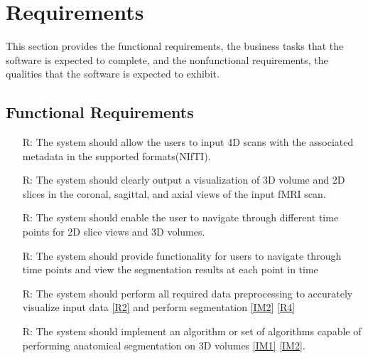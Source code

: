 \documentclass[12pt]{article}
\newcounter{reqnum} %
\begin{document}
\section{Requirements}

This section provides the functional requirements, the business tasks that the
software is expected to complete, and the nonfunctional requirements, the
qualities that the software is expected to exhibit.

\subsection{Functional Requirements}

\noindent \begin{itemize}

  \item[R\refstepcounter{reqnum}\thereqnum \label{R1}:] The system should allow the users
        to input 4D scans with the associated metadata in the supported formats(NIfTI).

  \item[R\refstepcounter{reqnum}\thereqnum \label{R2}:] The system should clearly
        output a visualization of 3D volume and 2D slices in the coronal, sagittal, and axial views
        of the input fMRI scan.

  \item[R\refstepcounter{reqnum}\thereqnum \label{R3}:]The system should enable the user
        to navigate through different time points for 2D slice views and 3D volumes.

  \item[R\refstepcounter{reqnum}\thereqnum \label{R4}:]The system should provide functionality for
        users to navigate through time points and view the segmentation results at each point in time

  \item[R\refstepcounter{reqnum}\thereqnum \label{R5}:] The system should perform all required data preprocessing
        to accurately visualize input data \ref*{R2} and perform segmentation \ref*{IM2} \ref*{R4}

  \item[R\refstepcounter{reqnum}\thereqnum \label{R6}:] The system should implement an algorithm or
        set of algorithms capable of performing anatomical segmentation on 3D volumes \ref{IM1} \ref*{IM2}.


\end{itemize}
\end{document}
